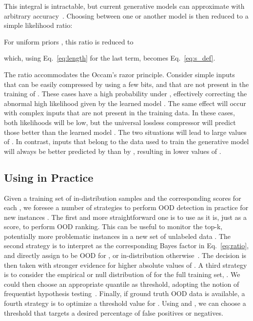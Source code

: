 \documentclass[letterpaper]{article} \usepackage{iclr2020_conference,times}
\begin{document}
This integral is intractable, but current generative models can approximate  with arbitrary accuracy~\citep{Kingma18NEURIPS}. Choosing between one or another model is then reduced to a simple likelihood ratio:

For uniform priors , this ratio is reduced to

which, using Eq.~\ref{eq:length} for the last term, becomes Eq.~\ref{eq:s_def}.

The ratio  accommodates the Occam's razor principle. 
Consider simple inputs that can be easily compressed by  using a few bits, and that are not present in the training of . These cases have a high probability under , effectively correcting the abnormal high likelihood given by the learned model . 
The same effect will occur with complex inputs that are not present in the training data. In these cases, both likelihoods will be low, but the universal lossless compressor  will predict those better than the learned model . The two situations will lead to large values of .
In contrast, inputs that belong to the data used to train the generative model  will always be better predicted by  than by , resulting in lower values of . 

\subsection{Using  in Practice}

Given a training set  of in-distribution samples and the corresponding scores  for each , we foresee a number of strategies to perform OOD detection in practice for new instances .
The first and more straightforward one is to use  as it is, just as a score, to perform OOD ranking. This can be useful to monitor the top-k, potentially more problematic instances  in a new set of unlabeled data .
The second strategy is to interpret  as the corresponding Bayes factor in Eq.~\ref{eq:ratio}, and directly assign  to be OOD for , or in-distribution otherwise~\citep[cf.][]{mackay2003information}. The decision is then taken with stronger evidence for higher absolute values of .
A third strategy is to consider the empirical or null distribution of  for the full training set, . We could then choose an appropriate quantile as threshold, adopting the notion of frequentist hypothesis testing~\citep[see for instance][]{Nalisnick19ARXIV}.
Finally, if ground truth OOD data  is available, a fourth strategy is to optimize a threshold value for . Using  and , we can choose a threshold that targets a desired percentage of false positives or negatives. 
\end{document}

